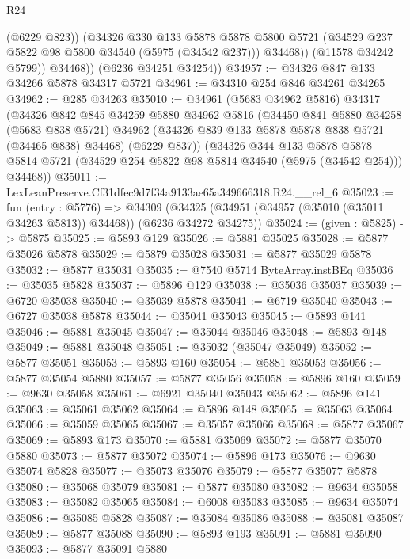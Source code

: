 \begin{lexlean}{R24}
\begin{coremodule}
                (@6229 @823))
              (@34326
                @330
                @133
                @5878
                @5878
                @5800
                @5721
                (@34529 @237 @5822 @98 @5800 @34540 (@5975 (@34542 @237)))
                @34468))
            (@11578 @34242 @5799))
          @34468))
      (@6236 @34251 @34254))
@34957 := @34326 @847 @133 @34266 @5878 @34317 @5721
@34961 := @34310 @254 @846 @34261 @34265
@34962 := @285 @34263
@35010 := @34961
    (@5683 @34962 @5816)
    @34317
    (@34326
      @842
      @845
      @34259
      @5880
      @34962
      @5816
      (@34450
        @841
        @5880
        @34258
        (@5683 @838 @5721)
        @34962
        (@34326 @839 @133 @5878 @5878 @838 @5721 (@34465 @838) @34468)
        (@6229 @837))
      (@34326
        @344
        @133
        @5878
        @5878
        @5814
        @5721
        (@34529 @254 @5822 @98 @5814 @34540 (@5975 (@34542 @254)))
        @34468))
@35011 := LexLeanPreserve.Cf31dfec9d7f34a9133ae65a349666318.R24.__rel_6
@35023 := fun (entry : @5776) =>
  @34309 (@34325 (@34951 (@34957 (@35010 (@35011 @34263 @5813)) @34468)) (@6236 @34272 @34275))
@35024 := (given : @5825) -> @5875
@35025 := @5893 @129
@35026 := @5881 @35025
@35028 := @5877 @35026 @5878
@35029 := @5879 @35028
@35031 := @5877 @35029 @5878
@35032 := @5877 @35031
@35035 := @7540 @5714 ByteArray.instBEq
@35036 := @35035 @5828
@35037 := @5896 @129
@35038 := @35036 @35037
@35039 := @6720 @35038
@35040 := @35039 @5878
@35041 := @6719 @35040
@35043 := @6727 @35038 @5878
@35044 := @35041 @35043
@35045 := @5893 @141
@35046 := @5881 @35045
@35047 := @35044 @35046
@35048 := @5893 @148
@35049 := @5881 @35048
@35051 := @35032 (@35047 @35049)
@35052 := @5877 @35051
@35053 := @5893 @160
@35054 := @5881 @35053
@35056 := @5877 @35054 @5880
@35057 := @5877 @35056
@35058 := @5896 @160
@35059 := @9630 @35058
@35061 := @6921 @35040 @35043
@35062 := @5896 @141
@35063 := @35061 @35062
@35064 := @5896 @148
@35065 := @35063 @35064
@35066 := @35059 @35065
@35067 := @35057 @35066
@35068 := @5877 @35067
@35069 := @5893 @173
@35070 := @5881 @35069
@35072 := @5877 @35070 @5880
@35073 := @5877 @35072
@35074 := @5896 @173
@35076 := @9630 @35074 @5828
@35077 := @35073 @35076
@35079 := @5877 @35077 @5878
@35080 := @35068 @35079
@35081 := @5877 @35080
@35082 := @9634 @35058
@35083 := @35082 @35065
@35084 := @6008 @35083
@35085 := @9634 @35074
@35086 := @35085 @5828
@35087 := @35084 @35086
@35088 := @35081 @35087
@35089 := @5877 @35088
@35090 := @5893 @193
@35091 := @5881 @35090
@35093 := @5877 @35091 @5880

\end{coremodule}
\end{lexlean}

